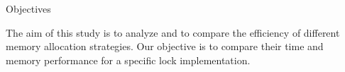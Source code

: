 \documentclass[final]{beamer}
\newlength{\sepwid}
\newlength{\onecolwid}
\begin{document}
\setlength{\belowcaptionskip}{3ex}							%
\setlength\belowdisplayshortskip{2ex}						%

\begin{frame}[t]											%

\begin{columns}[t]											%

\begin{column}{\sepwid}\end{column}							%
\begin{column}{\onecolwid}									%



\begin{alertblock}{Objectives}

The aim of this study is to analyze and to compare the efficiency of different memory allocation strategies.   Our objective is to compare their time and memory performance for a specific lock implementation.


\end{alertblock}



\end{column}
\end{columns}
\end{frame}
\end{document}
